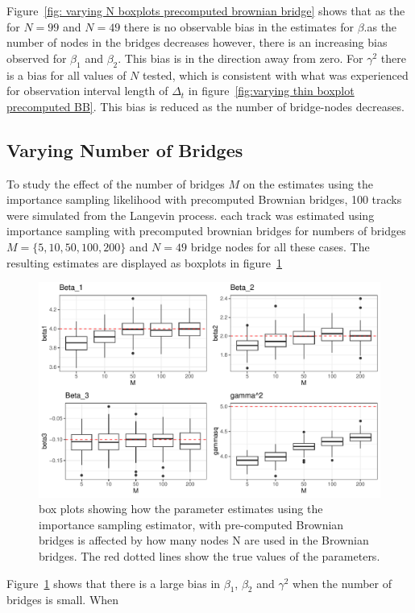 Figure~\ref{fig: varying N boxplots precomputed brownian bridge} shows that as the for $N=99$ and $N=49$ there is no observable bias in the estimates for $\beta$.as the number of nodes in the bridges decreases however, there is an increasing bias observed for $\beta_1$ and $\beta_2$. This bias is in the direction away from zero. For $\gamma^2$ there is a bias for all values of $N$ tested, which is consistent with what was experienced for observation interval length of $\Delta_t$ in figure~\ref{fig:varying thin boxplot precomputed BB}. This bias is reduced as the number of bridge-nodes decreases.

\subsection{Varying Number of Bridges}
To study the effect of the number of bridges $M$ on the estimates using the importance sampling likelihood with precomputed Brownian bridges, 100 tracks were simulated from the Langevin process. each track was estimated using importance sampling with precomputed brownian bridges for numbers of bridges $M=\{5,10,50,100,200\}$ and $N=49$ bridge nodes for all these cases. The resulting estimates are displayed as boxplots in figure~\ref{fig:varying M boxplots precomputed brownian bridge}

\begin{figure}[H]
    \centering
    \includegraphics[width=\linewidth]{Images/Results/varying M estimates boxplot precomputed BB.pdf}
    \caption[Box plots of Parameter Estimates for various Ns]{box plots showing how the parameter estimates using the importance sampling estimator, with pre-computed Brownian bridges is affected by how many nodes N are used in the Brownian bridges. The red dotted lines show the true values of the parameters.}
    \label{fig:varying M boxplots precomputed brownian bridge}
\end{figure}

Figure~\ref{fig:varying M boxplots precomputed brownian bridge} shows that there is a large bias in $\beta_1$, $\beta_2$ and $\gamma^2$ when the number of bridges is small. When 